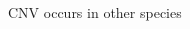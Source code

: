 \begin{columns}[t]
\begin{column}{0.40\textwidth}
\begin{block}{\large CNV occurs in other species}
    \end{block}
  \end{column}


\end{columns}


